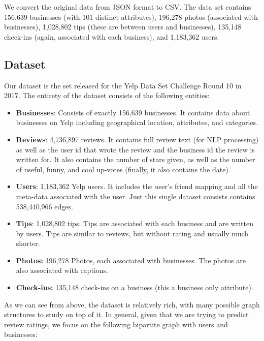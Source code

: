 \documentclass[letterpaper, 10 pt, conference]{ieeeconf}  %
\begin{document}
We convert the original data from JSON format to CSV. The data set contains 156,639 businesses (with 101 distinct attributes), 196,278 photos (associated with businesses), 1,028,802 tips (these are between users and businesses), 135,148 check-ins (again, associated with each business), and 1,183,362 users.

\subsection{Dataset}
Our dataset is the set released for the Yelp Data Set Challenge Round 10 \cite{YelpDataSet} in 2017. The entirety of the dataset consists of the following entities:
\begin{itemize}
\item \textbf{Businesses}: Consists of exactly 156,639 businesses. It contains data about businesses on Yelp including geographical location, attributes, and categories.
\item \textbf{Reviews}: 4,736,897 reviews. It contains full review text (for NLP processing) as well as the user id that wrote the review and the business id the review is written for. It also contains the number of stars given, as well as the number of useful, funny, and cool up-votes (finally, it also contains the date).
\item \textbf{Users}: 1,183,362 Yelp users. It includes the user's friend mapping and all the meta-data associated with the user. Just this single dataset consists contains 538,440,966 edges.
\item \textbf{Tips}: 1,028,802 tips. Tips are associated with each business and are written by users. Tips are similar to reviews, but without rating and usually much shorter.
\item \textbf{Photos:} 196,278 Photos, each associated with businesses. The photos are also associated with captions.
\item \textbf{Check-ins:} 135,148 check-ins on a business (this a business only attribute).
\end{itemize}

As we can see from above, the dataset is relatively rich, with many possible graph structures to study on top of it. In general, given that we are trying to predict review ratings, we focus on the following bipartite graph with users and businesses:
\end{document}
